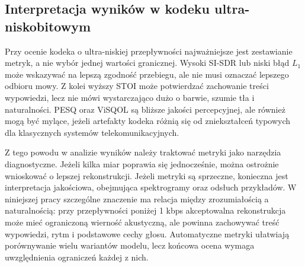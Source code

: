 \subsection{Interpretacja wyników w kodeku ultra-niskobitowym}
\label{subsec:interpretacja-metryk-ultra-low}

Przy ocenie kodeka o ultra-niskiej przepływności najważniejsze jest zestawianie metryk, a nie wybór jednej wartości granicznej. Wysoki SI-SDR lub niski błąd \(L_1\) może wskazywać na lepszą zgodność przebiegu, ale nie musi oznaczać lepszego odbioru mowy. Z kolei wyższy STOI może potwierdzać zachowanie treści wypowiedzi, lecz nie mówi wystarczająco dużo o barwie, szumie tła i naturalności. PESQ oraz ViSQOL są bliższe jakości percepcyjnej, ale również mogą być mylące, jeżeli artefakty kodeka różnią się od zniekształceń typowych dla klasycznych systemów telekomunikacyjnych.

Z tego powodu w analizie wyników należy traktować metryki jako narzędzia diagnostyczne. Jeżeli kilka miar poprawia się jednocześnie, można ostrożnie wnioskować o lepszej rekonstrukcji. Jeżeli metryki są sprzeczne, konieczna jest interpretacja jakościowa, obejmująca spektrogramy oraz odsłuch przykładów. W niniejszej pracy szczególne znaczenie ma relacja między zrozumiałością a naturalnością: przy przepływności poniżej 1 kbps akceptowalna rekonstrukcja może mieć ograniczoną wierność akustyczną, ale powinna zachowywać treść wypowiedzi, rytm i podstawowe cechy głosu. Automatyczne metryki ułatwiają porównywanie wielu wariantów modelu, lecz końcowa ocena wymaga uwzględnienia ograniczeń każdej z nich.
